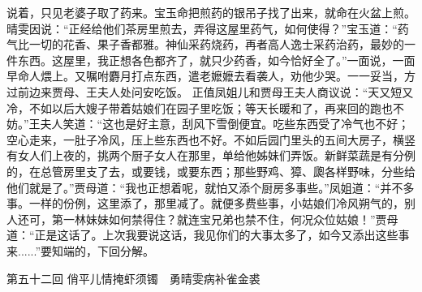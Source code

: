\documentclass[12pt,oneside]{book}
\begin{document}
说着，只见老婆子取了药来。宝玉命把煎药的银吊子找了出来，就命在火盆上煎。晴雯因说：“正经给他们茶房里煎去，弄得这屋里药气，如何使得？”宝玉道：“药气比一切的花香、果子香都雅。神仙采药烧药，再者高人逸士采药治药，最妙的一件东西。这屋里，我正想各色都齐了，就只少药香，如今恰好全了。”一面说，一面早命人煨上。又嘱咐麝月打点东西，遣老嬷嬷去看袭人，劝他少哭。一一妥当，方过前边来贾母、王夫人处问安吃饭。
正值凤姐儿和贾母王夫人商议说：“天又短又冷，不如以后大嫂子带着姑娘们在园子里吃饭；等天长暖和了，再来回的跑也不妨。”王夫人笑道：“这也是好主意，刮风下雪倒便宜。吃些东西受了冷气也不好；空心走来，一肚子冷风，压上些东西也不好。不如后园门里头的五间大房子，横竖有女人们上夜的，挑两个厨子女人在那里，单给他姊妹们弄饭。新鲜菜蔬是有分例的，在总管房里支了去，或要钱，或要东西；那些野鸡、獐、瓟各样野味，分些给他们就是了。”贾母道：“我也正想着呢，就怕又添个厨房多事些。”凤姐道：“并不多事。一样的份例，这里添了，那里减了。就便多费些事，小姑娘们冷风朔气的，别人还可，第一林妹妹如何禁得住？就连宝兄弟也禁不住，何况众位姑娘！”贾母道：“正是这话了。上次我要说这话，我见你们的大事太多了，如今又添出这些事来......”要知端的，下回分解。
 


 
第五十二回  俏平儿情掩虾须镯　勇晴雯病补雀金裘
\end{document}
